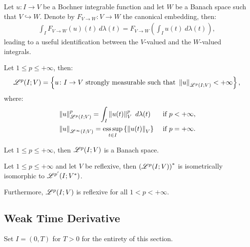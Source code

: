 \begin{remark}[Embedding]
    Let $u\colon I \rightarrow V$ be a Bochner integrable function and let $W$ be a Banach space such that $V \hookrightarrow W$. Denote by $F_{V \rightarrow W} \colon V \rightarrow W$ the canonical embedding, then:
    \begin{align}
        \int_I F_{V \rightarrow W}(u)(t) ~ d \lambda(t) = F_{V \rightarrow W}\left( \int_I u(t) ~ d \lambda(t) \right),
    \end{align}
    leading to a useful identification between the $V$-valued and the $W$-valued integrals.
\end{remark}

\begin{definition}[$\SpaceLp{p}(I; V)$]
    Let $1 \leq p \leq +\infty$, then:
    \begin{align}
        \mathscr{L}^{p}(I; V) = \left\{ u \colon I \rightarrow V \text{ strongly measurable such that } \left\lVert u \right\rVert_{\mathscr{L}^{p}(I; V)} < +\infty \right\},
    \end{align}
    where:
    \begin{align}
        & \left\lVert u \right\rVert_{\mathscr{L}^{p}(I; V)}^p = \int_I \left\lVert u(t) \right\rVert_V^p ~ d \lambda(t) & \text{ if } p < +\infty, \\
        & \left\lVert u \right\rVert_{\mathscr{L}^{\infty}(I; V)} = \operatorname*{ess\,sup}_{t \in I} \left\{ \left\lVert u(t) \right\rVert_V \right\} & \text{ if } p = +\infty.
    \end{align}
\end{definition}

\begin{theorem}
    Let $1 \leq p \leq +\infty$, then $\SpaceLp{p}(I; V)$ is a Banach space.
\end{theorem}

\begin{theorem} %
    Let $1 \leq p \leq +\infty$ and let $V$ be reflexive, then $\left( \mathscr{L}^{p}(I; V) \right)^*$ is isometrically isomorphic to $\mathscr{L}^{p^{\prime}}(I; V^*)$.

    Furthermore, $\SpaceLp{p}(I; V)$ is reflexive for all $1 < p < +\infty$.
\end{theorem}

\newpage
\subsection{Weak Time Derivative}

Set $I = (0, T)$ for $T > 0$ for the entirety of this section.

